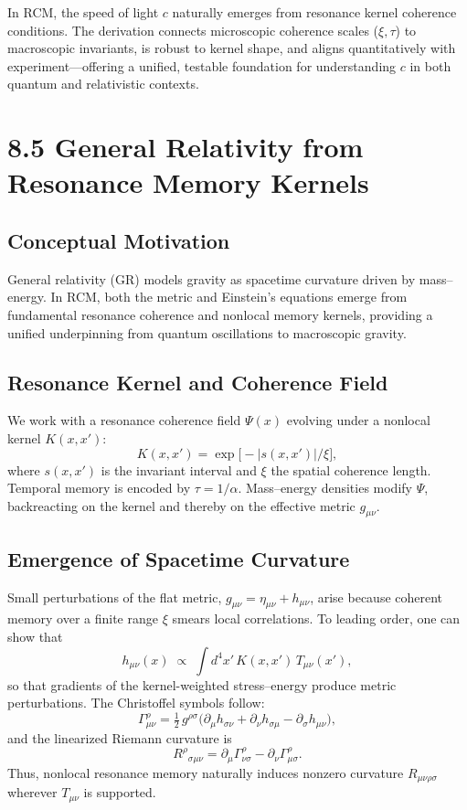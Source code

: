 In RCM, the speed of light \(c\) naturally emerges from resonance kernel coherence conditions. The derivation connects microscopic coherence scales (\(\xi,\tau\)) to macroscopic invariants, is robust to kernel shape, and aligns quantitatively with experiment—offering a unified, testable foundation for understanding \(c\) in both quantum and relativistic contexts.

\section{8.5 General Relativity from Resonance Memory Kernels}

\subsection{Conceptual Motivation}

General relativity (GR) models gravity as spacetime curvature driven by mass–energy.  In RCM, both the metric and Einstein’s equations emerge from fundamental resonance coherence and nonlocal memory kernels, providing a unified underpinning from quantum oscillations to macroscopic gravity.

\subsection{Resonance Kernel and Coherence Field}

We work with a resonance coherence field \(\Psi(x)\) evolving under a nonlocal kernel \(K(x,x')\):
\[
K(x,x') = \exp\!\bigl[-|s(x,x')|/\xi\bigr],
\]
where \(s(x,x')\) is the invariant interval and \(\xi\) the spatial coherence length.  Temporal memory is encoded by \(\tau=1/\alpha\).  Mass–energy densities modify \(\Psi\), backreacting on the kernel and thereby on the effective metric \(g_{\mu\nu}\).

\subsection{Emergence of Spacetime Curvature}

Small perturbations of the flat metric, \(g_{\mu\nu}=\eta_{\mu\nu}+h_{\mu\nu}\), arise because coherent memory over a finite range \(\xi\) smears local correlations.  To leading order, one can show that
\[
h_{\mu\nu}(x) \;\propto\; \int d^4x'\,K(x,x')\,T_{\mu\nu}(x'),
\]
so that gradients of the kernel-weighted stress–energy produce metric perturbations.  The Christoffel symbols follow:
\[
\Gamma^\rho_{\mu\nu}
=\tfrac12\,g^{\rho\sigma}\bigl(\partial_\mu h_{\sigma\nu}
+\partial_\nu h_{\sigma\mu}-\partial_\sigma h_{\mu\nu}\bigr),
\]
and the linearized Riemann curvature is
\[
R^\rho{}_{\sigma\mu\nu}
=\partial_\mu\Gamma^\rho_{\nu\sigma}-\partial_\nu\Gamma^\rho_{\mu\sigma}.
\]
Thus, nonlocal resonance memory naturally induces nonzero curvature \(R_{\mu\nu\rho\sigma}\) wherever \(T_{\mu\nu}\) is supported.

